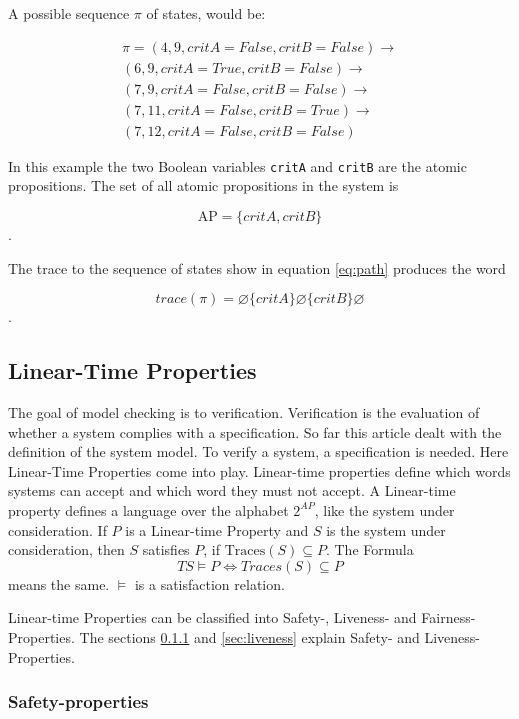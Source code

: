\documentclass[a4paper, twoside]{article}
\begin{document}
A possible sequence $\pi$ of states, would be:

\begin{equation}
  \label{eq:path}
  \begin{split}
\pi = (4, 9, {critA}={False},{critB}=False) \rightarrow \\
(6, 9, {critA}={True},{critB}=False) \rightarrow \\
(7, 9, {critA}={False},{critB}=False) \rightarrow \\
(7, 11, {critA}={False},{critB}=True) \rightarrow \\
(7, 12, {critA}={False},{critB}=False)
  \end{split}
\end{equation}

In this example the two Boolean variables \verb|critA| and \verb|critB| are the atomic propositions. The set of all atomic propositions in the system is

\[
\text{AP}=\{critA, critB\}
\].

The trace to the sequence of states show in equation \ref{eq:path} produces the word

\[
trace(\pi) = \varnothing \{critA\} \varnothing \{critB\} \varnothing
\].

\subsection{Linear-Time Properties}
\label{sec:satisfactionrelations}

The goal of model checking is to verification. Verification is the evaluation of whether a system complies with a specification. So far this article dealt with the definition of the system model. To verify a system, a specification is needed. Here Linear-Time Properties come into play. Linear-time properties define which words systems can accept and which word they must not accept. A Linear-time property defines a language over the alphabet $2^{AP}$, like the system under consideration. If $P$ is a Linear-time Property and $S$ is the system under consideration, then $S$ satisfies $P$, if $\text{Traces}(S) \subseteq P$. The Formula 
\[
TS \models P \iff Traces(S) \subseteq P 
\]
means the same. $ \models $ is a satisfaction relation.

Linear-time Properties can be classified into Safety-, Liveness- and Fairness-Properties. The sections \ref{sec:safety} and \ref{sec:liveness} explain Safety- and Liveness-Properties.

\subsubsection{Safety-properties}
\label{sec:safety}
\end{document}
